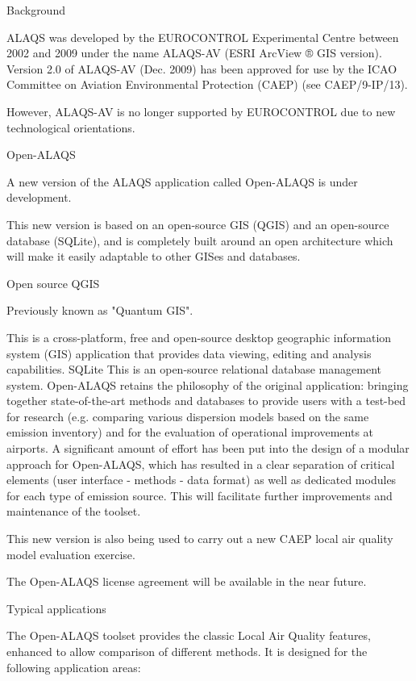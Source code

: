 \documentclass[a4paper]{article}
\begin{document}
    Background
    
    ALAQS was developed by the EUROCONTROL Experimental Centre between 2002 and 2009 under the name ALAQS-AV (ESRI ArcView ® GIS version). Version 2.0 of ALAQS-AV (Dec. 2009) has been approved for use by the ICAO Committee on Aviation Environmental Protection (CAEP) (see CAEP/9-IP/13).
    
    However, ALAQS-AV is no longer supported by EUROCONTROL due to new technological orientations.
    
    
    Open-ALAQS
    
    A new version of the ALAQS application called Open-ALAQS is under development.
    
    This new version is based on an open-source GIS (QGIS) and an open-source database (SQLite), and is completely built around an open architecture which will make it easily adaptable to other GISes and databases.
    
    Open source
    QGIS
    
    Previously known as "Quantum GIS".
    
    This is a cross-platform, free and open-source desktop geographic information system (GIS) application that provides data viewing, editing and analysis capabilities.
    SQLite	This is an open-source relational database management system.
    Open-ALAQS retains the philosophy of the original application: bringing together state-of-the-art methods and databases to provide users with a test-bed for research (e.g. comparing various dispersion models based on the same emission inventory) and for the evaluation of operational improvements at airports. A significant amount of effort has been put into the design of a modular approach for Open-ALAQS, which has resulted in a clear separation of critical elements (user interface - methods - data format) as well as dedicated modules for each type of emission source. This will facilitate further improvements and maintenance of the toolset.
    
    This new version is also being used to carry out a new CAEP local air quality model evaluation exercise.
    
    The Open-ALAQS license agreement will be available in the near future.
    
    
    Typical applications
    
    The Open-ALAQS toolset provides the classic Local Air Quality features, enhanced to allow comparison of different methods. It is designed for the following application areas:
    
\end{document}
